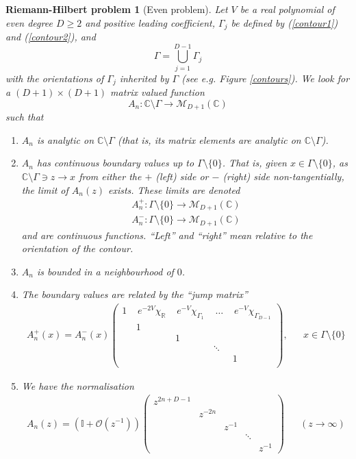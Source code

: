 \documentclass[12pt]{article}
\newtheorem{rhp}[theorem]{Riemann-Hilbert problem}
\theoremstyle{definition}
\begin{document}
\begin{rhp}[Even problem]\label{evenrhp} Let $V$ be a real polynomial of even degree $D \geq 2$ and positive leading coefficient, $\Gamma_j$ be defined by (\ref{contour1}) and (\ref{contour2}), and
\begin{equation}\label{gamma}
\Gamma = \bigcup_{j=1}^{D-1} \Gamma_j
\end{equation}
with the orientations of $\Gamma_j$ inherited by $\Gamma$ (see e.g. Figure \ref{contours}). We look for a $(D+1) \times (D+1)$ matrix valued function $$A_{n} : \mathbb{C}\setminus \Gamma \to  \mathcal{M}_{D+1}(\mathbb{C})$$ such that
\begin{enumerate}
\item $A_{n}$ is analytic on $\mathbb{C}\setminus \Gamma$ (that is, its matrix elements are analytic on $\mathbb{C}\setminus \Gamma$).
\item $A_{n}$ has continuous boundary values up to $\Gamma \setminus \{ 0 \}$. That is,  given $x \in \Gamma \setminus \{ 0 \}$,  as $\mathbb{C}\setminus \Gamma  \ni  z \to x$ from either the $+$ (left) side or $-$ (right) side non-tangentially,  the limit of $A_{n}(z)$ exists. These limits are denoted
\begin{align*}
A_{n}^+ : \Gamma \setminus \{ 0 \} \to \mathcal{M}_{D+1}(\mathbb{C})  \\
A_{n}^- : \Gamma \setminus \{ 0 \} \to \mathcal{M}_{D+1}(\mathbb{C})
\end{align*}
and are continuous functions.  \enquote{Left} and \enquote{right} mean relative to the orientation of the contour. 
\item $A_{n}$ is bounded in a neighbourhood of $0$.
\item The boundary values are related by the \enquote{jump matrix}
\begin{align}
A_{n}^{+}(x) = A_{n}^{-}(x)\left(
\begin{array}{ccccccccccccccccccc}
1 \,  & \, e^{-2V} \chi_\mathbb{R} \,  & \,  e^{-V} \chi_{\Gamma_1} \,   & \,  \dots \,  & \,  e^{-V} \chi_{\Gamma_{D-1}}   \\
& 1 \\
& & 1 \\
& & & \ddots \\
& & & & 1 \\
\end{array} \right), & & x \in \Gamma \setminus \{ 0 \}
\end{align}
\item We have the normalisation
\begin{align*}
A_{n}(z) = \left(\mathbb{I}+ \mathcal{O}(z^{-1})\right) \left(\begin{matrix}
z^{2n+D-1} \\
& z^{-2n} \\
& & z^{-1} \\
& & & \ddots  \\
& & & & z^{-1}
\end{matrix} \right) & & (z \to \infty)
\end{align*}
\end{enumerate}
\end{rhp}
\end{document}
